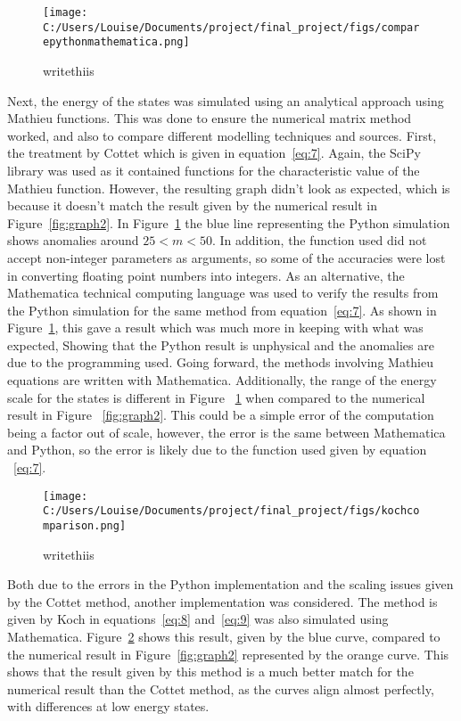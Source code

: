 \documentclass[11pt]{article}
\begin{document}
\begin{figure}[ht]
\centering
\texttt{[image: C:/Users/Louise/Documents/project/final\_project/figs/comparepythonmathematica.png]}
\caption{writethiis}
\label{fig:graph3}
\end{figure}
Next, the energy of the states was simulated using an analytical approach using Mathieu functions. This was done to ensure the numerical matrix method worked, and also to compare different modelling techniques and sources. First, the treatment by Cottet which is given in equation~\ref{eq:7}. Again, the SciPy library was used as it contained functions for the characteristic value of the Mathieu function. However, the resulting graph didn't look as expected, which is because it doesn't match the result given by the numerical result in Figure~\ref{fig:graph2}. In Figure~\ref{fig:graph3} the blue line representing the Python simulation shows anomalies around $25 < m < 50$. In addition, the function used did not accept non-integer parameters as arguments, so some of the accuracies were lost in converting floating point numbers into integers. As an alternative, the Mathematica technical computing language was used to verify the results from the Python simulation for the same method from equation~\ref{eq:7}. As shown in Figure~\ref{fig:graph3}, this gave a result which was much more in keeping with what was expected, Showing that the Python result is unphysical and the anomalies are due to the programming used. Going forward, the methods involving Mathieu equations are written with Mathematica.
Additionally, the range of the energy scale for the states is different in Figure ~\ref{fig:graph3} when compared to the numerical result in Figure ~\ref{fig:graph2}. This could be a simple error of the computation being a factor out of scale, however, the error is the same between Mathematica and Python, so the error is likely due to the function used given by equation ~\ref{eq:7}.
\begin{figure}[ht]
\centering
\texttt{[image: C:/Users/Louise/Documents/project/final\_project/figs/kochcomparison.png]}
\caption{writethiis}
\label{fig:graph4}
\end{figure}
Both due to the errors in the Python implementation and the scaling issues given by the Cottet method, another implementation was considered. The method is given by Koch in equations~\ref{eq:8} and~\ref{eq:9} was also simulated using Mathematica. Figure~\ref{fig:graph4} shows this result, given by the blue curve, compared to the numerical result in Figure~\ref{fig:graph2} represented by the orange curve. This shows that the result given by this method is a much better match for the numerical result than the Cottet method, as the curves align almost perfectly, with differences at low energy states.
\end{document}
